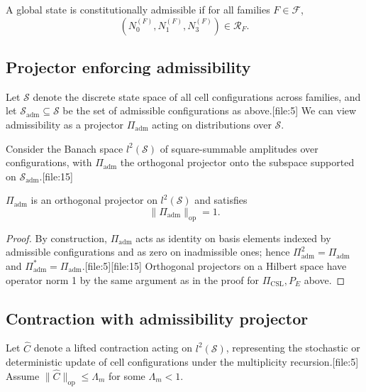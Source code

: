 \documentclass[11pt]{article}
\begin{document}
\begin{definition}
A global state is constitutionally admissible if for all families \(F\in\mathcal{F}\),
\[
(N_0^{(F)},N_1^{(F)},N_3^{(F)}) \in \mathcal{R}_F.
\]
\end{definition}

\subsection{Projector enforcing admissibility}

Let \(\mathcal{S}\) denote the discrete state space of all cell configurations across families, and let \(\mathcal{S}_{\mathrm{adm}}\subseteq \mathcal{S}\) be the set of admissible configurations as above.[file:5]  
We can view admissibility as a projector \(\Pi_{\mathrm{adm}}\) acting on distributions over \(\mathcal{S}\).

Consider the Banach space \(l^2(\mathcal{S})\) of square-summable amplitudes over configurations, with \(\Pi_{\mathrm{adm}}\) the orthogonal projector onto the subspace supported on \(\mathcal{S}_{\mathrm{adm}}\).[file:15]

\begin{lemma}
\(\Pi_{\mathrm{adm}}\) is an orthogonal projector on \(l^2(\mathcal{S})\) and satisfies
\[
\|\Pi_{\mathrm{adm}}\|_{\mathrm{op}} = 1.
\]
\end{lemma}

\begin{proof}
By construction, \(\Pi_{\mathrm{adm}}\) acts as identity on basis elements indexed by admissible configurations and as zero on inadmissible ones; hence \(\Pi_{\mathrm{adm}}^2=\Pi_{\mathrm{adm}}\) and \(\Pi_{\mathrm{adm}}^\ast=\Pi_{\mathrm{adm}}\).[file:5][file:15]  
Orthogonal projectors on a Hilbert space have operator norm 1 by the same argument as in the proof for \(\Pi_{\mathrm{CSL}},P_E\) above.
\end{proof}

\subsection{Contraction with admissibility projector}

Let \(\widehat{C}\) denote a lifted contraction acting on \(l^2(\mathcal{S})\), representing the stochastic or deterministic update of cell configurations under the multiplicity recursion.[file:5]  
Assume \(\|\widehat{C}\|_{\mathrm{op}} \le \Lambda_m\) for some \(\Lambda_m<1\).
\end{document}
